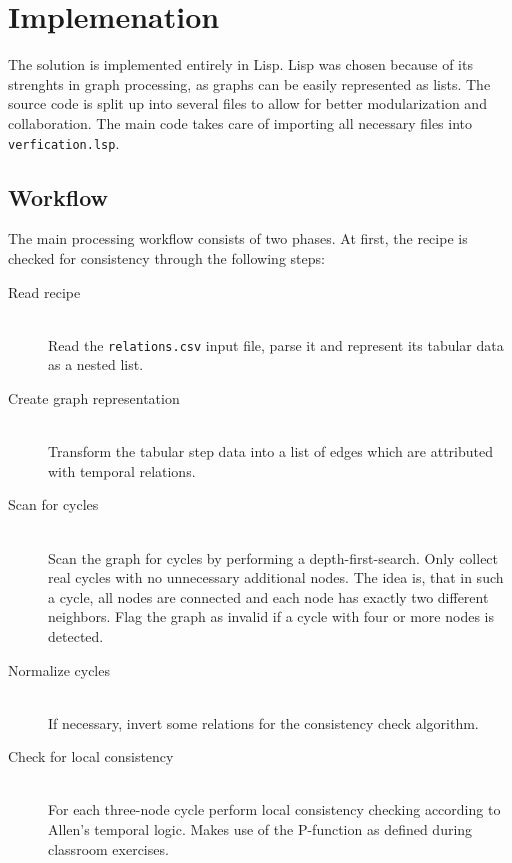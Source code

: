 \chapter{Implemenation}
\label{sec:impl}

    The solution is implemented entirely in Lisp. Lisp was chosen because of its
    strenghts in graph processing, as graphs can be easily represented as lists.
    The source code is split up into several files to allow for better
    modularization and collaboration. The main code takes care of importing all
    necessary files into \texttt{verfication.lsp}.
    
    \section{Workflow}
    
        The main processing workflow consists of two phases. At first, the
        recipe is checked for consistency through the following steps:
        
        \begin{description}
            \item[Read recipe] \hfill \\
                Read the \texttt{relations.csv} input file, parse it and
                represent its tabular data as a nested list.
            \item[Create graph representation] \hfill \\
                Transform the tabular step data into a list of edges which are
                attributed with temporal relations.
            \item[Scan for cycles] \hfill \\
                Scan the graph for cycles by performing a depth-first-search.
                Only collect real cycles with no unnecessary additional nodes.
                The idea is, that in such a cycle, all nodes are connected and
                each node has exactly two different neighbors. Flag the graph as
                invalid if a cycle with four or more nodes is detected.
            \item[Normalize cycles] \hfill \\
                If necessary, invert some relations for the consistency check
                algorithm.
            \item[Check for local consistency] \hfill \\
                For each three-node cycle perform local consistency checking
                according to Allen's temporal logic. Makes use of the P-function
                as defined during classroom exercises.
        \end{description}
        
